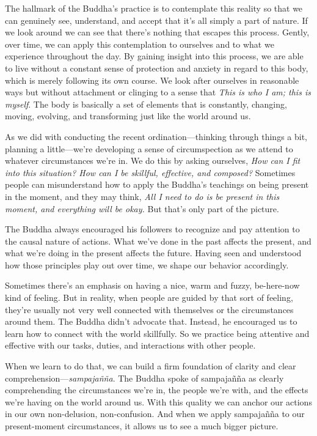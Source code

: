 The hallmark of the Buddha's practice is to contemplate this reality so 
that we can genuinely see, understand, and accept that it's all simply 
a part of nature. If we look around we can see that there's nothing 
that escapes this process. Gently, over time, we can apply this 
contemplation to ourselves and to what we experience throughout the 
day. By gaining insight into this process, we are able to live without 
a constant sense of protection and anxiety in regard to this body, 
which is merely following its own course. We look after ourselves in 
reasonable ways but without attachment or clinging to a sense that 
\emph{This is who I am; this is myself}. The body is basically a set of 
elements that is constantly, changing, moving, evolving, and 
transforming just like the world around us.


As we did with conducting the recent ordination---thinking through 
things a bit, planning a little---we're developing a sense of 
circumspection as we attend to whatever circumstances we're in. We do 
this by asking ourselves, \emph{How can I fit into this situation? How 
can I be skillful, effective, and composed?} Sometimes people can 
misunderstand how to apply the Buddha's teachings on being present in 
the moment, and they may think, \emph{All I need to do is be present in 
this moment, and everything will be okay.} But that's only part of the 
picture.

The Buddha always encouraged his followers to recognize and pay 
attention to the causal nature of actions. What we've done in the past 
affects the present, and what we're doing in the present affects the 
future. Having seen and understood how those principles play out over 
time, we shape our behavior accordingly.

Sometimes there's an emphasis on having a nice, warm and fuzzy, 
be-here-now kind of feeling. But in reality, when people are guided by 
that sort of feeling, they're usually not very well connected with 
themselves or the circumstances around them. The Buddha didn't advocate 
that. Instead, he encouraged us to learn how to connect with the world 
skillfully. So we practice being attentive and effective with our 
tasks, duties, and interactions with other people.

When we learn to do that, we can build a firm foundation of clarity and 
clear comprehension---\emph{sampajañña}. The Buddha spoke of 
sampajañña as clearly comprehending the circumstances we're in, the 
people we're with, and the effects we're having on the world around us. 
With this quality we can anchor our actions in our own non-delusion, 
non-confusion. And when we apply sampajañña to our present-moment 
circumstances, it allows us to see a much bigger picture.

